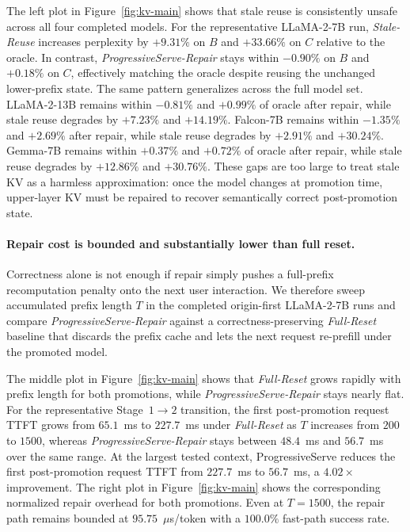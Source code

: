 The left plot in Figure~\ref{fig:kv-main} shows that stale reuse is consistently unsafe across all four completed models.
For the representative LLaMA-2-7B run, \textit{Stale-Reuse} increases perplexity by \(+9.31\%\) on \(B\) and \(+33.66\%\) on \(C\) relative to the oracle.
In contrast, \textit{ProgressiveServe-Repair} stays within \(-0.90\%\) on \(B\) and \(+0.18\%\) on \(C\), effectively matching the oracle despite reusing the unchanged lower-prefix state.
The same pattern generalizes across the full model set.
LLaMA-2-13B remains within \(-0.81\%\) and \(+0.99\%\) of oracle after repair, while stale reuse degrades by \(+7.23\%\) and \(+14.19\%\).
Falcon-7B remains within \(-1.35\%\) and \(+2.69\%\) after repair, while stale reuse degrades by \(+2.91\%\) and \(+30.24\%\).
Gemma-7B remains within \(+0.37\%\) and \(+0.72\%\) of oracle after repair, while stale reuse degrades by \(+12.86\%\) and \(+30.76\%\).
These gaps are too large to treat stale KV as a harmless approximation: once the model changes at promotion time, upper-layer KV must be repaired to recover semantically correct post-promotion state.

\paragraph{Repair cost is bounded and substantially lower than full reset.}
Correctness alone is not enough if repair simply pushes a full-prefix recomputation penalty onto the next user interaction.
We therefore sweep accumulated prefix length \(T\) in the completed origin-first LLaMA-2-7B runs and compare \textit{ProgressiveServe-Repair} against a correctness-preserving \textit{Full-Reset} baseline that discards the prefix cache and lets the next request re-prefill under the promoted model.

The middle plot in Figure~\ref{fig:kv-main} shows that \textit{Full-Reset} grows rapidly with prefix length for both promotions, while \textit{ProgressiveServe-Repair} stays nearly flat.
For the representative Stage~\(1\!\rightarrow\!2\) transition, the first post-promotion request TTFT grows from \(65.1\)~ms to \(227.7\)~ms under \textit{Full-Reset} as \(T\) increases from \(200\) to \(1500\), whereas \textit{ProgressiveServe-Repair} stays between \(48.4\)~ms and \(56.7\)~ms over the same range.
At the largest tested context, ProgressiveServe reduces the first post-promotion request TTFT from \(227.7\)~ms to \(56.7\)~ms, a \(4.02\times\) improvement.
The right plot in Figure~\ref{fig:kv-main} shows the corresponding normalized repair overhead for both promotions.
Even at \(T{=}1500\), the repair path remains bounded at \(95.75\)~\(\mu\)s/token with a \(100.0\%\) fast-path success rate.


